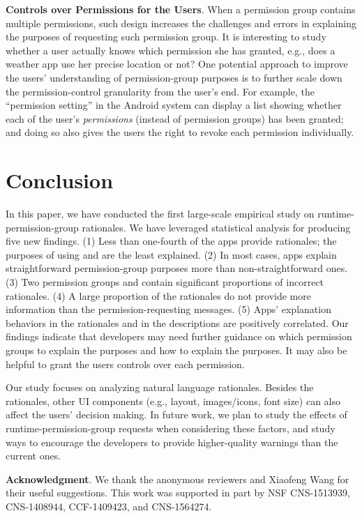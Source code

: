 \textbf{Controls over Permissions for the Users}. When a permission group contains multiple permissions, such design increases the challenges and errors in explaining the purposes of requesting such permission group.  
It is interesting to study whether a user actually knows which permission she has granted, e.g., does a weather app use her precise location or not? 
One potential approach to improve the users' understanding of permission-group purposes is to further scale down the permission-control granularity from the user's end. 
For example, the ``permission setting'' in the Android system can display a list showing whether each of the user's \emph{permissions} (instead of permission groups) has been granted; and doing so also gives the users the right to revoke each permission individually. 

\vspace{-0.07in}
\section{Conclusion}
\label{sec:conclusion}

In this paper, we have conducted the first large-scale empirical study on runtime-permission-group rationales. 
We have leveraged statistical analysis for producing five new findings. 
(1) Less than one-fourth of the apps provide rationales; the purposes of using  and  are the least explained. 
(2) In most cases, apps explain straightforward permission-group purposes more than non-straightforward ones. 
(3) Two permission groups  and  contain significant proportions of incorrect rationales. 
(4) A large proportion of the rationales do not provide more information than the permission-requesting messages. 
(5) Apps' explanation behaviors in the rationales and in the descriptions are positively correlated. 
Our findings indicate that developers may need further guidance on which permission groups to explain the purposes and how to explain the purposes. 
It may also be helpful to grant the users controls over each permission. 

Our study focuses on analyzing natural language rationales. 
Besides the rationales, other UI components (e.g., layout, images/icons, font size) can also affect the users' decision making. 
In future work, we plan to study the effects of runtime-permission-group requests when considering these factors, and study ways to encourage the developers to provide higher-quality warnings than the current ones. 

\noindent \textbf{Acknowledgment}. We thank the anonymous reviewers and Xiaofeng Wang for their useful suggestions. This work was supported in part by NSF CNS-1513939, CNS-1408944,  CCF-1409423, and CNS-1564274. 